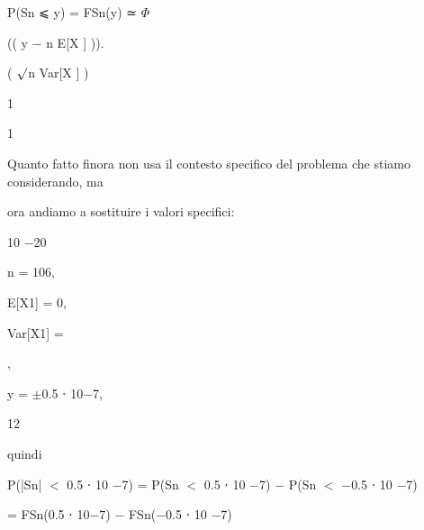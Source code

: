 \documentclass[a4paper,portrait,12pt]{article}
\begin{document}
\begin{flushleft}
P(Sn ⩽ y) = FSn(y) ≃ $\Phi$
\end{flushleft}





\begin{flushleft}
(( y $-$ n E[X ] )).
\end{flushleft}


\begin{flushleft}
( $\surd$n Var[X ] )
\end{flushleft}


1





1





\begin{flushleft}
Quanto fatto finora non usa il contesto specifico del problema che stiamo considerando, ma
\end{flushleft}


\begin{flushleft}
ora andiamo a sostituire i valori specifici:
\end{flushleft}


10 $-$20


\begin{flushleft}
n = 106,
\end{flushleft}


\begin{flushleft}
E[X1] = 0,
\end{flushleft}


\begin{flushleft}
Var[X1] =
\end{flushleft}


,


\begin{flushleft}
y = $\pm$0.5 ⋅ 10$-$7,
\end{flushleft}


12


\begin{flushleft}
quindi
\end{flushleft}


\begin{flushleft}
P(|Sn| $<$ 0.5 ⋅ 10 $-$7) = P(Sn $<$ 0.5 ⋅ 10 $-$7) $-$ P(Sn $<$ $-$0.5 ⋅ 10 $-$7)
\end{flushleft}


\begin{flushleft}
= FSn(0.5 ⋅ 10$-$7) $-$ FSn($-$0.5 ⋅ 10 $-$7)
\end{flushleft}
\end{document}
